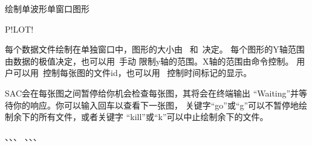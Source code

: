 \label{cmd:plot}

绘制单波形单窗口图形

\begin{SACSTX}
P!LOT!
\end{SACSTX}

每个数据文件绘制在单独窗口中，图形的大小由
~和~决定。
每个图形的Y轴范围由数据的极值决定，也可以用~手动
限制y轴的范围。X轴的范围由命令控制。
用户可以用~控制每张图的文件id，也可以用
~控制时间标记的显示。

SAC会在每张图之间暂停给你机会检查每张图，其将会在终端输出
``Waiting''并等待你的响应。你可以输入回车以查看下一张图，
关键字``go''或``g''可以不暂停地绘制余下的所有文件，或者关键字
``kill''或``k''可以中止绘制余下的文件。

、、、
、、、

